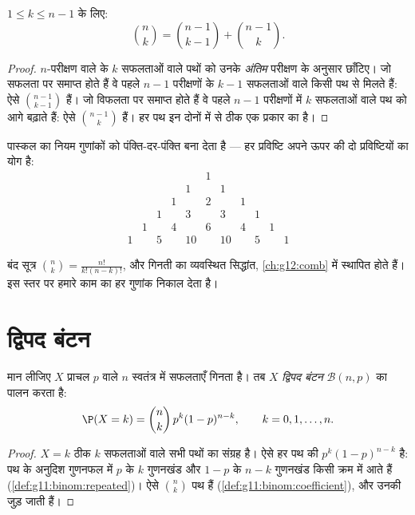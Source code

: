 \begin{proposition}[पास्कल का नियम]\label{prop:g11:binom:pascal}
$1 \leq k \leq n - 1$ के लिए:
\[
\binom{n}{k} = \binom{n-1}{k-1} + \binom{n-1}{k}.
\]
\end{proposition}

\begin{proof}
$n$-परीक्षण वाले  के $k$ सफलताओं वाले पथों को उनके \emph{अंतिम}
परीक्षण के अनुसार छाँटिए। जो सफलता पर समाप्त होते हैं वे पहले $n-1$
परीक्षणों के $k - 1$ सफलताओं वाले किसी पथ से मिलते हैं: ऐसे $\binom{n-1}{k-1}$ हैं। जो विफलता
पर समाप्त होते हैं वे पहले $n-1$ परीक्षणों में $k$ सफलताओं वाले पथ को आगे
बढ़ाते हैं: ऐसे $\binom{n-1}{k}$ हैं। हर पथ इन दोनों में से ठीक एक प्रकार का है।
\end{proof}

पास्कल का नियम गुणांकों को पंक्ति-दर-पंक्ति बना देता है --- हर प्रविष्टि अपने
ऊपर की दो प्रविष्टियों का योग है:
\[
\begin{array}{ccccccccccc}
&&&&&1&&&&&\\
&&&&1&&1&&&&\\
&&&1&&2&&1&&&\\
&&1&&3&&3&&1&&\\
&1&&4&&6&&4&&1&\\
1&&5&&10&&10&&5&&1
\end{array}
\]

\begin{remark}
बंद सूत्र $\binom nk = \frac{n!}{k!(n-k)!}$, और गिनती का व्यवस्थित सिद्धांत, \cref{ch:g12:comb} में स्थापित होते हैं।
इस स्तर पर  हमारे काम का हर गुणांक निकाल देता है।
\end{remark}

\section{द्विपद बंटन}

\begin{theorem}[द्विपद बंटन]\label{thm:g11:binom:binomial}
मान लीजिए $X$ प्राचल $p$ वाले $n$ स्वतंत्र  में सफलताएँ
गिनता है। तब $X$ \emph{द्विपद बंटन} $\mathcal B(n, p)$ का पालन करता है:
\[
\P(X = k) = \binom{n}{k}\, p^k (1-p)^{n-k},
\qquad k = 0, 1, \dots, n .
\]
\end{theorem}

\begin{proof}
 $X = k$ ठीक $k$ सफलताओं वाले सभी पथों का संग्रह है। ऐसे हर पथ की
 $p^k(1-p)^{n-k}$ है: पथ के अनुदिश गुणनफल में $p$ के $k$ गुणनखंड और $1-p$ के
$n - k$ गुणनखंड किसी क्रम में आते हैं (\cref{def:g11:binom:repeated})। ऐसे $\binom nk$ पथ हैं (\cref{def:g11:binom:coefficient}), और उनकी
 जुड़ जाती हैं।
\end{proof}

